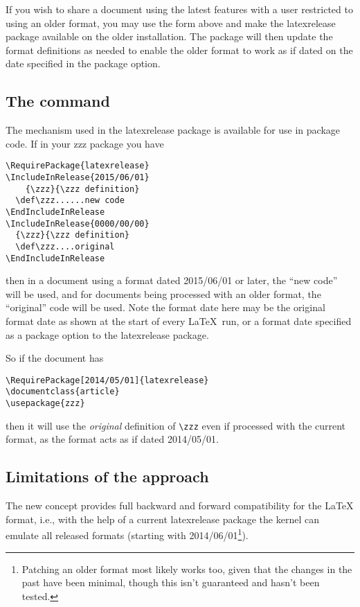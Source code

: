 \documentclass{ltnews}
\begin{document}
If you wish to share a document using the latest features with a
user restricted to using an older
format, you may use the form above and make the \textsf{latexrelease} package
available on the older installation.  The package will then update the format
definitions as needed to enable the older format to work as if dated on the date
specified in the package option.

\subsection{The  command}

The mechanism used in the \textsf{latexrelease} package is available for use in
package code. If in your \textsf{zzz} package you have
\begin{verbatim}
\RequirePackage{latexrelease}
\IncludeInRelease{2015/06/01}
    {\zzz}{\zzz definition}
  \def\zzz......new code
\EndIncludeInRelease
\IncludeInRelease{0000/00/00}
  {\zzz}{\zzz definition}
  \def\zzz....original
\EndIncludeInRelease
\end{verbatim}
then in a document using a format dated 2015/06/01 or later, the ``new code''
will be used, and for documents being processed with an older format, the
``original'' code will be used. Note the format date here may be the original
format date as shown at the start of every \LaTeX\ run, or a format date
specified as a package option to the \textsf{latexrelease} package. 

So if the document has
\begin{verbatim}
\RequirePackage[2014/05/01]{latexrelease}
\documentclass{article}
\usepackage{zzz}
\end{verbatim}
then it will use the \emph{original} definition of \verb|\zzz| even if
processed with the current format, as the format acts as if dated 2014/05/01.


\subsection{Limitations of the approach}

The new concept provides full backward and forward compatibility for
the \LaTeX{} format, i.e., with the help of a current
\textsf{latexrelease} package the kernel can emulate all released
formats (starting with 2014/06/01\footnote{Patching an older format
  most likely works too, given that the changes in the past have been
  minimal, though this isn't guaranteed and hasn't been tested.}).
\end{document}
